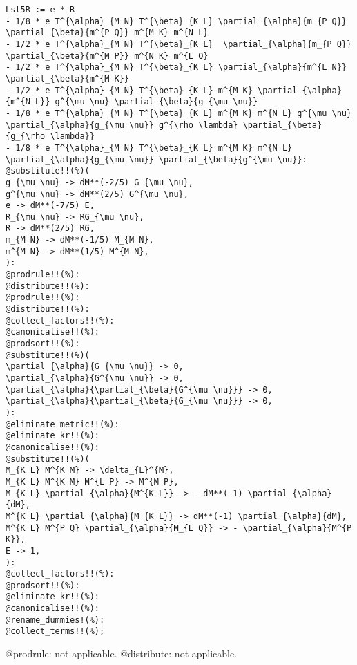 \documentclass[11pt]{article}
\begin{document}
{\color[named]{Blue}\begin{verbatim}
Lsl5R := e * R
- 1/8 * e T^{\alpha}_{M N} T^{\beta}_{K L} \partial_{\alpha}{m_{P Q}} \partial_{\beta}{m^{P Q}} m^{M K} m^{N L} 
- 1/2 * e T^{\alpha}_{M N} T^{\beta}_{K L}  \partial_{\alpha}{m_{P Q}} \partial_{\beta}{m^{M P}} m^{N K} m^{L Q} 
- 1/2 * e T^{\alpha}_{M N} T^{\beta}_{K L} \partial_{\alpha}{m^{L N}} \partial_{\beta}{m^{M K}}
- 1/2 * e T^{\alpha}_{M N} T^{\beta}_{K L} m^{M K} \partial_{\alpha}{m^{N L}} g^{\mu \nu} \partial_{\beta}{g_{\mu \nu}}
- 1/8 * e T^{\alpha}_{M N} T^{\beta}_{K L} m^{M K} m^{N L} g^{\mu \nu} \partial_{\alpha}{g_{\mu \nu}} g^{\rho \lambda} \partial_{\beta}{g_{\rho \lambda}}
- 1/8 * e T^{\alpha}_{M N} T^{\beta}_{K L} m^{M K} m^{N L} \partial_{\alpha}{g_{\mu \nu}} \partial_{\beta}{g^{\mu \nu}}:
@substitute!!(%)(
g_{\mu \nu} -> dM**(-2/5) G_{\mu \nu},
g^{\mu \nu} -> dM**(2/5) G^{\mu \nu},
e -> dM**(-7/5) E,
R_{\mu \nu} -> RG_{\mu \nu},
R -> dM**(2/5) RG,
m_{M N} -> dM**(-1/5) M_{M N},
m^{M N} -> dM**(1/5) M^{M N},
):
@prodrule!!(%):
@distribute!!(%):
@prodrule!!(%):
@distribute!!(%):
@collect_factors!!(%):
@canonicalise!!(%):
@prodsort!!(%):
@substitute!!(%)(
\partial_{\alpha}{G_{\mu \nu}} -> 0,
\partial_{\alpha}{G^{\mu \nu}} -> 0,
\partial_{\alpha}{\partial_{\beta}{G^{\mu \nu}}} -> 0,
\partial_{\alpha}{\partial_{\beta}{G_{\mu \nu}}} -> 0,
):
@eliminate_metric!!(%):
@eliminate_kr!!(%):
@canonicalise!!(%):
@substitute!!(%)(
M_{K L} M^{K M} -> \delta_{L}^{M},
M_{K L} M^{K M} M^{L P} -> M^{M P},
M_{K L} \partial_{\alpha}{M^{K L}} -> - dM**(-1) \partial_{\alpha}{dM},
M^{K L} \partial_{\alpha}{M_{K L}} -> dM**(-1) \partial_{\alpha}{dM},
M^{K L} M^{P Q} \partial_{\alpha}{M_{L Q}} -> - \partial_{\alpha}{M^{P K}},
E -> 1,
):
@collect_factors!!(%):
@prodsort!!(%):
@eliminate_kr!!(%):
@canonicalise!!(%):
@rename_dummies!(%):
@collect_terms!!(%);
\end{verbatim}}
@prodrule: not applicable.
@distribute: not applicable.
\end{document}
